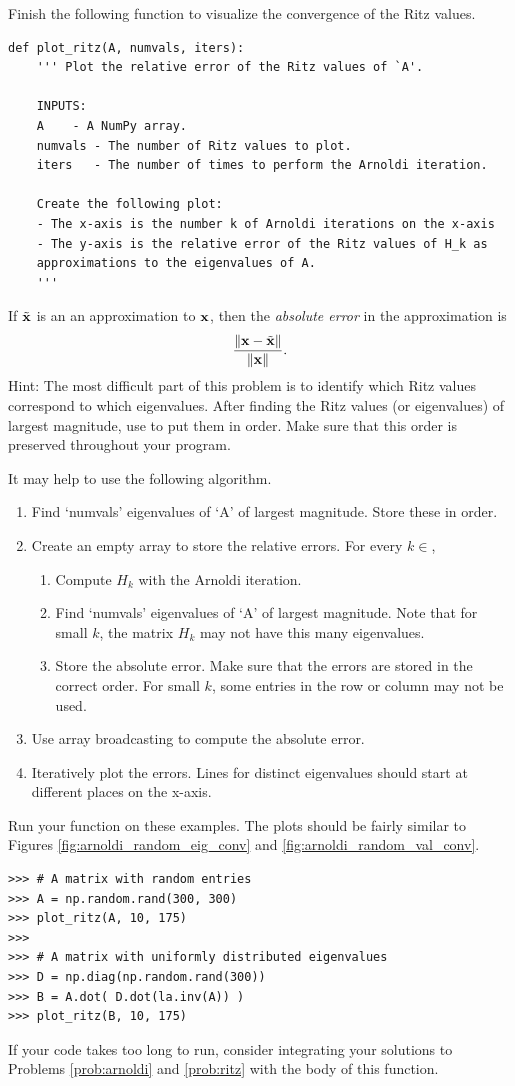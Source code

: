 \begin{problem}
Finish the following function to visualize the convergence of the Ritz values.
\begin{lstlisting}
def plot_ritz(A, numvals, iters):
    ''' Plot the relative error of the Ritz values of `A'.
    
    INPUTS:
    A    - A NumPy array.
    numvals - The number of Ritz values to plot.
    iters   - The number of times to perform the Arnoldi iteration.
    
    Create the following plot:
    - The x-axis is the number k of Arnoldi iterations on the x-axis
    - The y-axis is the relative error of the Ritz values of H_k as 
    approximations to the eigenvalues of A.
    '''
    \end{lstlisting}
If $\tilde{{\bf x}}$ is an an approximation to ${\bf x}$, then the \emph{absolute error} in the approximation is 
\[
\frac{\|{\bf x} - \tilde{{\bf x}}\|}{\|{\bf x}\|}.
\]
Hint: The most difficult part of this problem is to identify which Ritz values correspond to which eigenvalues. 
After finding the Ritz values (or eigenvalues) of largest magnitude, use  to put them in order. 
Make sure that this order is preserved throughout your program.

It may help to use the following algorithm.
\begin{enumerate}
\item Find `numvals' eigenvalues of `A' of largest magnitude. Store these in order.
\item Create an empty array to store the relative errors. For every $k \in $\li{[1, iters)}, 
\begin{enumerate}
\item Compute $H_k$ with the Arnoldi iteration.
\item Find `numvals' eigenvalues of `A' of largest magnitude. Note that for small $k$, the matrix $H_k$ may not have this many eigenvalues.
\item Store the absolute error. Make sure that the errors are stored in the correct order. For small $k$, some entries in the row or column may not be used. 
\end{enumerate}
\item Use array broadcasting to compute the absolute error.
\item Iteratively plot the errors. Lines for distinct eigenvalues should start at different places on the x-axis.
\end{enumerate}

Run your function on these examples. 
The plots should be fairly similar to Figures \ref{fig:arnoldi_random_eig_conv} and \ref{fig:arnoldi_random_val_conv}.
\begin{lstlisting}
>>> # A matrix with random entries
>>> A = np.random.rand(300, 300)
>>> plot_ritz(A, 10, 175)
>>>
>>> # A matrix with uniformly distributed eigenvalues
>>> D = np.diag(np.random.rand(300))
>>> B = A.dot( D.dot(la.inv(A)) )
>>> plot_ritz(B, 10, 175)
\end{lstlisting}
If your code takes too long to run, consider integrating your solutions to Problems \ref{prob:arnoldi} and \ref{prob:ritz} with the body of this function.
\end{problem}
